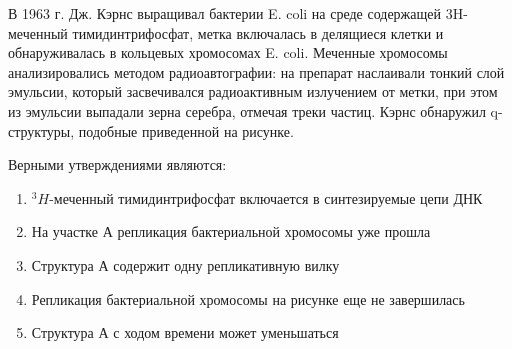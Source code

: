
В 1963 г. Дж. Кэрнс выращивал бактерии E. coli на среде содержащей 3H-меченный
тимидинтрифосфат, метка включалась в делящиеся клетки и обнаруживалась в
кольцевых хромосомах E. coli.
Меченные хромосомы анализировались методом радиоавтографии: на препарат
наслаивали тонкий слой эмульсии, который засвечивался радиоактивным излучением
от метки, при этом из эмульсии выпадали зерна серебра, отмечая треки частиц.
Кэрнс обнаружил q-структуры, подобные приведенной на рисунке.


Верными утверждениями являются:

\begin{enumerate}
    \item ${}^{3}H$-меченный тимидинтрифосфат включается в синтезируемые цепи ДНК
    \item На участке А репликация бактериальной хромосомы уже прошла
    \item Структура А содержит одну репликативную вилку
    \item Репликация бактериальной хромосомы на рисунке еще не завершилась
    \item Структура А с ходом времени может уменьшаться
\end{enumerate}

\explanationSection

